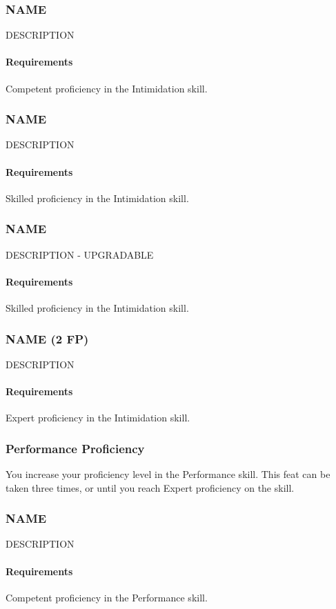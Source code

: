 \subsubsection{NAME} \label{feat::name}
    DESCRIPTION
    \paragraph{Requirements} Competent proficiency in the Intimidation skill.
\subsubsection{NAME} \label{feat::name}
    DESCRIPTION
    \paragraph{Requirements} Skilled proficiency in the Intimidation skill.
\subsubsection{NAME} \label{feat::name}
    DESCRIPTION - UPGRADABLE
    \paragraph{Requirements} Skilled proficiency in the Intimidation skill.
\subsubsection{NAME (2 FP)} \label{feat::name}
    DESCRIPTION
    \paragraph{Requirements} Expert proficiency in the Intimidation skill.
\subsubsection{Performance Proficiency} \label{feat::performanceprof}
    You increase your proficiency level in the Performance skill.
    This feat can be taken three times, or until you reach Expert proficiency on the skill.
\subsubsection{NAME} \label{feat::name}
    DESCRIPTION
    \paragraph{Requirements} Competent proficiency in the Performance skill.

